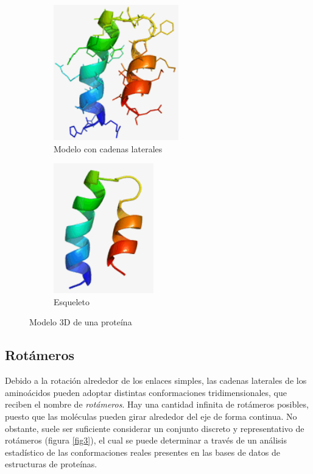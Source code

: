 \documentclass[letterpaper, 12pt]{report}
\begin{document}
\begin{figure}[h!]
    
    \begin{subfigure}[b]{0.49\textwidth}
        \begin{center}
            \includegraphics[scale=0.8]{images/protein.png} 
            \caption{Modelo con cadenas laterales}  
        \end{center}              
    \end{subfigure}    
    \begin{subfigure}[b]{0.49\textwidth}
        \begin{center}
            \includegraphics[scale=0.8]{images/backbone.png}  
            \caption{Esqueleto}  
        \end{center}             
    \end{subfigure}
    \caption{Modelo 3D de una proteína}
    \label{fig2}
\end{figure}









\subsection{Rot\'ameros}

Debido a la rotaci\'on alrededor de los enlaces simples, las cadenas laterales de los aminoácidos pueden adoptar distintas
conformaciones tridimensionales, que reciben el nombre de \textit{rotámeros}. Hay una cantidad 
infinita de rotámeros posibles, puesto que las moléculas pueden girar alrededor del eje de forma continua.
No obstante, suele ser suficiente considerar un conjunto discreto y representativo de rotámeros (figura \ref{fig3}),
el cual se puede determinar a través de un análisis estadístico de las conformaciones reales presentes en las 
bases de datos de estructuras de proteínas. \\
\end{document}
